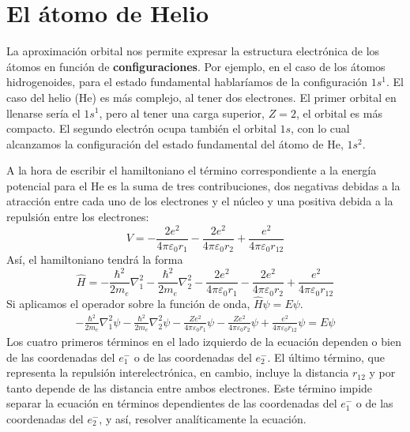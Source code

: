\section{El átomo de Helio}
La aproximación orbital nos permite expresar la estructura electrónica
de los átomos en función de \textbf{configuraciones}. Por ejemplo, en el caso 
de los átomos hidrogenoides, para el estado fundamental hablaríamos de la 
configuración $1s^1$. El caso del helio (He) es más complejo, al tener dos 
electrones. El primer orbital en llenarse sería el $1s^1$, pero al tener
una carga superior, $Z=2$, el orbital es más compacto. El segundo electrón
ocupa también el orbital $1s$, con lo cual alcanzamos la configuración del
estado fundamental del átomo de He, $1s^2$.

A la hora de escribir el hamiltoniano el término correspondiente a la
energía potencial para el He es la suma de tres contribuciones, dos 
negativas debidas a la atracción entre cada uno de los electrones y
el núcleo y una positiva debida a la repulsión entre los electrones:
\begin{equation}
    V= -\frac{2e^2}{4\pi \varepsilon_0r_1} -\frac{2e^2}{4\pi \varepsilon_0r_2} + \frac{e^2}{4\pi \varepsilon_0r_{12}} 
\end{equation}
Así, el hamiltoniano tendrá la forma
\begin{equation}
    \hat{H}=  -\frac{\hbar^2}{2m_e}\nabla_1^2 -\frac{\hbar^2}{2m_e}\nabla_2^2 -\frac{2e^2}{4\pi \varepsilon_0r_1} -\frac{2e^2}{4\pi \varepsilon_0r_2} + \frac{e^2}{4\pi \varepsilon_0r_{12}}
\end{equation}
Si aplicamos el operador sobre la función de onda, $\hat{H}\psi=E\psi$.
\begin{align}
    -\frac{\hbar^2}{2m_e}\nabla_1^2\psi 
    -\frac{\hbar^2}{2m_e}\nabla_2^2\psi 
    -\frac{Ze^2}{4\pi \varepsilon_0r_1}\psi 
    -\frac{Ze^2}{4\pi \varepsilon_0r_2}\psi 
    + \frac{e^2}{4\pi \varepsilon_0r_{12}}\psi 
    = E\psi
    \label{eq:he_exact}    
\end{align}
Los cuatro primeros términos en el lado izquierdo de la ecuación 
dependen o bien de las coordenadas del $e^-_1$ o de las coordenadas 
del $e^-_2$. El último término, que representa la repulsión interelectrónica,
en cambio, incluye la distancia $r_{12}$ y por tanto depende de las distancia entre ambos electrones. Este término impide separar la ecuación en términos 
dependientes de las coordenadas del $e^-_1$ o de las coordenadas 
del $e^-_2$, y así, resolver analíticamente la ecuación. 

